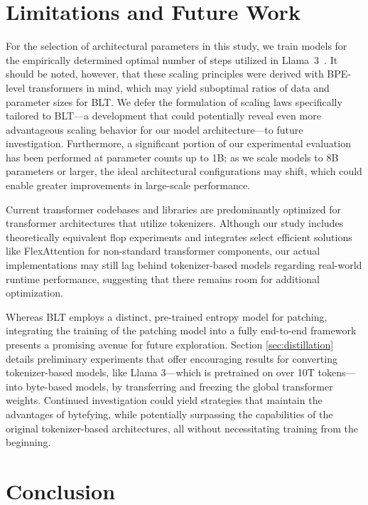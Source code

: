 \section{Limitations and Future Work}

For the selection of architectural parameters in this study, we train models for the empirically determined optimal number of steps utilized in Llama~3~\citep{dubey2024llama}. It should be noted, however, that these scaling principles were derived with BPE-level transformers in mind, which may yield suboptimal ratios of data and parameter sizes for {\textsc BLT}. We defer the formulation of scaling laws specifically tailored to {\textsc BLT}—a development that could potentially reveal even more advantageous scaling behavior for our model architecture—to future investigation. Furthermore, a significant portion of our experimental evaluation has been performed at parameter counts up to 1B; as we scale models to 8B parameters or larger, the ideal architectural configurations may shift, which could enable greater improvements in large-scale performance.

Current transformer codebases and libraries are predominantly optimized for transformer architectures that utilize tokenizers. Although our study includes theoretically equivalent flop experiments and integrates select efficient solutions like FlexAttention for non-standard transformer components, our actual implementations may still lag behind tokenizer-based models regarding real-world runtime performance, suggesting that there remains room for additional optimization.

Whereas {\textsc BLT} employs a distinct, pre-trained entropy model for patching, integrating the training of the patching model into a fully end-to-end framework presents a promising avenue for future exploration. Section \ref{sec:distillation} details preliminary experiments that offer encouraging results for converting tokenizer-based models, like Llama 3—which is pretrained on over 10T tokens—into byte-based models, by transferring and freezing the global transformer weights. Continued investigation could yield strategies that maintain the advantages of bytefying, while potentially surpassing the capabilities of the original tokenizer-based architectures, all without necessitating training from the beginning.

\section{Conclusion}
\label{section:conclusion}

